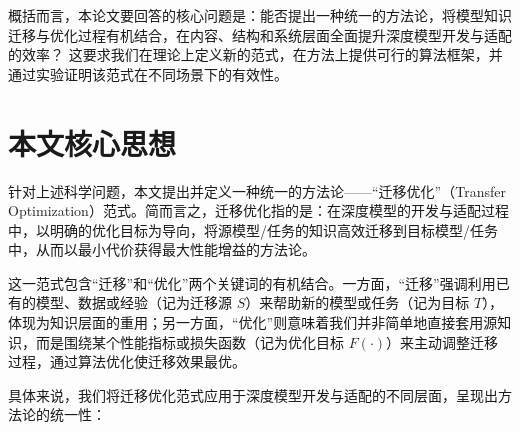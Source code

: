 \documentclass[../main.tex]{subfiles}
\begin{document}
概括而言，本论文要回答的核心问题是：能否提出一种统一的方法论，将模型知识迁移与优化过程有机结合，在内容、结构和系统层面全面提升深度模型开发与适配的效率？ 这要求我们在理论上定义新的范式，在方法上提供可行的算法框架，并通过实验证明该范式在不同场景下的有效性。

\section[\hspace{-2pt}本文核心思想————迁移优化范式]{{\heiti{} \hspace{-8pt}本文核心思想}}\label{sec:core-idea}

针对上述科学问题，本文提出并定义一种统一的方法论——“迁移优化”（Transfer Optimization）范式。简而言之，迁移优化指的是：在深度模型的开发与适配过程中，以明确的优化目标为导向，将源模型/任务的知识高效迁移到目标模型/任务中，从而以最小代价获得最大性能增益的方法论。

这一范式包含“迁移”和“优化”两个关键词的有机结合。一方面，“迁移”强调利用已有的模型、数据或经验（记为迁移源 $S$）来帮助新的模型或任务（记为目标 $T$），体现为知识层面的重用；另一方面，“优化”则意味着我们并非简单地直接套用源知识，而是围绕某个性能指标或损失函数（记为优化目标 $F(\cdot)$）来主动调整迁移过程，通过算法优化使迁移效果最优。

具体来说，我们将迁移优化范式应用于深度模型开发与适配的不同层面，呈现出方法论的统一性：
\end{document}
